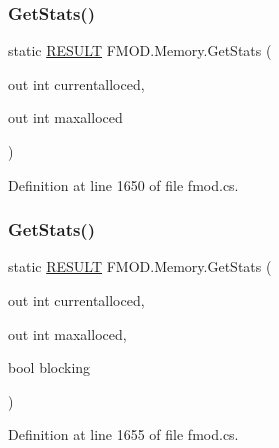 \subsubsection{\texorpdfstring{Get\+Stats()}{GetStats()}\hspace{0.1cm}{\footnotesize\ttfamily [1/2]}}
{\footnotesize\ttfamily static \hyperlink{namespace_f_m_o_d_a305d1176ef3f8c8815861a60407ac33d}{R\+E\+S\+U\+LT} F\+M\+O\+D.\+Memory.\+Get\+Stats (\begin{DoxyParamCaption}\item[{out int}]{currentalloced,  }\item[{out int}]{maxalloced }\end{DoxyParamCaption})\hspace{0.3cm}{\ttfamily [static]}}



Definition at line 1650 of file fmod.\+cs.

\mbox{\label{class_f_m_o_d_1_1_memory_a9b18082622b96b6a8d7fb2fa5cb30fca}} 
\subsubsection{\texorpdfstring{Get\+Stats()}{GetStats()}\hspace{0.1cm}{\footnotesize\ttfamily [2/2]}}
{\footnotesize\ttfamily static \hyperlink{namespace_f_m_o_d_a305d1176ef3f8c8815861a60407ac33d}{R\+E\+S\+U\+LT} F\+M\+O\+D.\+Memory.\+Get\+Stats (\begin{DoxyParamCaption}\item[{out int}]{currentalloced,  }\item[{out int}]{maxalloced,  }\item[{bool}]{blocking }\end{DoxyParamCaption})\hspace{0.3cm}{\ttfamily [static]}}



Definition at line 1655 of file fmod.\+cs.

\mbox{\label{class_f_m_o_d_1_1_memory_a6a15839b63f1f6df1ee41d192026d8c4}} 
